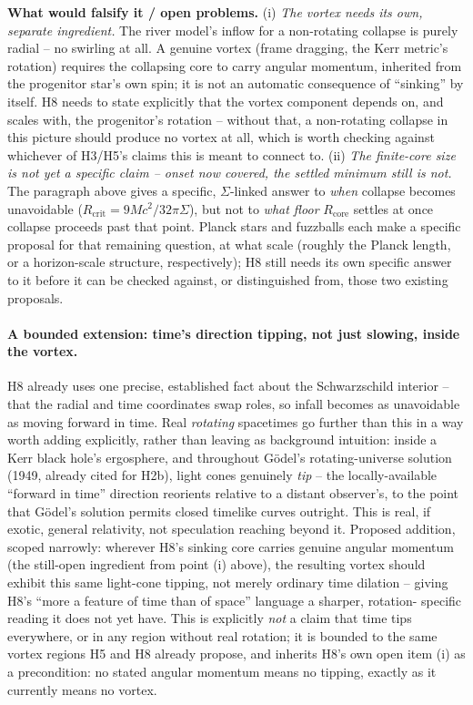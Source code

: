 \documentclass[12pt, a4paper]{article}
\begin{document}
\textbf{What would falsify it / open problems.}
(i) \emph{The vortex needs its own, separate ingredient.} The river
model's inflow for a non-rotating collapse is purely radial -- no
swirling at all. A genuine vortex (frame dragging, the Kerr metric's
rotation) requires the collapsing core to carry angular momentum,
inherited from the progenitor star's own spin; it is not an automatic
consequence of ``sinking'' by itself. H8 needs to state explicitly
that the vortex component depends on, and scales with, the
progenitor's rotation -- without that, a non-rotating collapse in
this picture should produce no vortex at all, which is worth checking
against whichever of H3/H5's claims this is meant to connect to.
(ii) \emph{The finite-core size is not yet a specific claim --
onset now covered, the settled minimum still is not.} The paragraph
above gives a specific, $\Sigma$-linked answer to \emph{when}
collapse becomes unavoidable ($R_{\text{crit}}=9Mc^2/32\pi\Sigma$),
but not to \emph{what floor} $R_{\mathrm{core}}$ settles at once
collapse proceeds past that point. Planck stars and fuzzballs each
make a specific proposal for that remaining question, at what scale
(roughly the Planck length, or a horizon-scale structure,
respectively); H8 still needs its own specific answer to it before
it can be checked against, or distinguished from, those two existing
proposals.

\paragraph{A bounded extension: time's direction tipping, not just
slowing, inside the vortex.} H8 already uses one precise, established
fact about the Schwarzschild interior -- that the radial and time
coordinates swap roles, so infall becomes as unavoidable as moving
forward in time. Real \emph{rotating} spacetimes go further than this
in a way worth adding explicitly, rather than leaving as background
intuition: inside a Kerr black hole's ergosphere, and throughout
G\"odel's rotating-universe solution (1949, already cited for H2b),
light cones genuinely \emph{tip} -- the locally-available ``forward in
time'' direction reorients relative to a distant observer's, to the
point that G\"odel's solution permits closed timelike curves outright.
This is real, if exotic, general relativity, not speculation reaching
beyond it. Proposed addition, scoped narrowly: wherever H8's sinking
core carries genuine angular momentum (the still-open ingredient from
point (i) above), the resulting vortex should exhibit this same
light-cone tipping, not merely ordinary time dilation -- giving H8's
``more a feature of time than of space'' language a sharper, rotation-
specific reading it does not yet have. This is explicitly \emph{not}
a claim that time tips everywhere, or in any region without real
rotation; it is bounded to the same vortex regions H5 and H8 already
propose, and inherits H8's own open item (i) as a precondition: no
stated angular momentum means no tipping, exactly as it currently
means no vortex.
\end{document}
